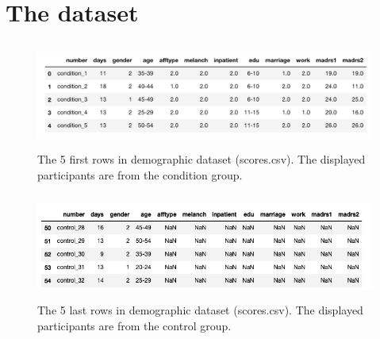 \section{The dataset}

\begin{figure}[h]
  \begin{center}
      \includegraphics[height=3.5cm]{img/demographics.png}
      \caption{The 5 first rows in demographic dataset (scores.csv). The displayed participants are from the condition group.}
      \label{figure:demographics}
  \end{center}
\end{figure}

\begin{figure}[h]
  \begin{center}
      \includegraphics[height=3.5cm]{img/demographics_control.png}
      \caption{The 5 last rows in demographic dataset (scores.csv). The displayed participants are from the control group.}
      \label{figure:demographics_control}
  \end{center}
\end{figure}

